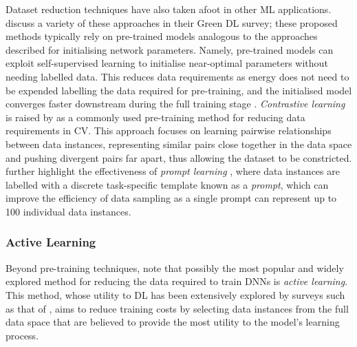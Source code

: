 \documentclass[a4paper, 11pt]{report}
\begin{document}
    Dataset reduction techniques have also taken afoot in other ML applications. \citet{xu-2021} discuss a variety of these approaches in their Green DL survey; these proposed methods typically rely on pre-trained models analogous to the approaches described for initialising network parameters. Namely, pre-trained models can exploit self-supervised learning to initialise near-optimal parameters without needing labelled data. This reduces data requirements as energy does not need to be expended labelling the data required for pre-training, and the initialised model converges faster downstream during the full training stage \citep{xu-2021}. \emph{Contrastive learning} \citep{chen-2020} is raised by \citet{xu-2021} as a commonly used pre-training method for reducing data requirements in CV. This approach focuses on learning pairwise relationships between data instances, representing similar pairs close together in the data space and pushing divergent pairs far apart, thus allowing the dataset to be constricted. \citet{xu-2021} further highlight the effectiveness of \emph{prompt learning} \citep{liu-2021}, where data instances are labelled with a discrete task-specific template known as a \emph{prompt}, which can improve the efficiency of data sampling as a single prompt can represent up to 100 individual data instances. 


    \subsubsection{Active Learning}

    Beyond pre-training techniques, \citet{xu-2021} note that possibly the most popular and widely explored method for reducing the data required to train DNNs is \emph{active learning}. This method, whose utility to DL has been extensively explored by surveys such as that of \citet{ren-2021}, aims to reduce training costs by selecting data instances from the full data space that are believed to provide the most utility to the model's learning process. 
\end{document}
